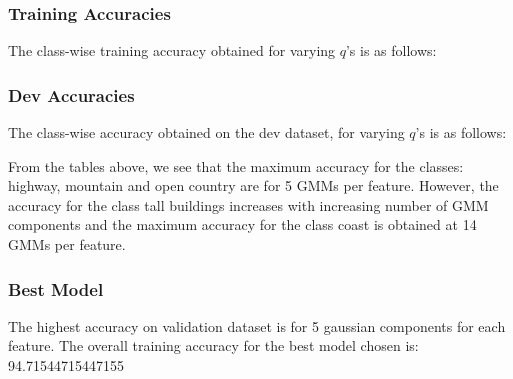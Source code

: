 \documentclass[11pt,a4paper]{article}
\newcommand{\noi}{\noindent}
\begin{document}
\subsubsection{Training Accuracies}
The class-wise training accuracy obtained for varying $q$'s is as follows:



\subsubsection{Dev Accuracies}
The class-wise accuracy obtained on the dev dataset, for varying $q$'s is as follows:


\noi
From the tables above, we see that the maximum accuracy for the classes: highway, mountain and open country are for 5 GMMs per feature. However, the accuracy for the class tall buildings increases with increasing number of GMM components and the maximum accuracy for the class coast is obtained at 14 GMMs per feature.

\subsubsection{Best Model}
The highest accuracy on validation dataset is for 5 gaussian components for each feature. The overall training accuracy for the best model chosen is: 94.71544715447155\\
\end{document}
